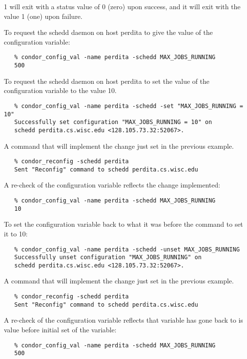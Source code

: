 \begin{ManPage}{\label{man-condor-config-val}}{1}
 will exit with a status value of 0 (zero) upon success,
and it will exit with the value 1 (one) upon failure.

\Examples

To request the schedd daemon on host perdita
to give the value of the
configuration variable:
\begin{verbatim}
   % condor_config_val -name perdita -schedd MAX_JOBS_RUNNING
   500
\end{verbatim}

To request the schedd daemon on host perdita
to set the value of the 
configuration variable
to the value 10.
\begin{verbatim}
   % condor_config_val -name perdita -schedd -set "MAX_JOBS_RUNNING = 10"
   Successfully set configuration "MAX_JOBS_RUNNING = 10" on 
   schedd perdita.cs.wisc.edu <128.105.73.32:52067>.
\end{verbatim}

A command that will implement the change just set in the previous
example.
\begin{verbatim}
   % condor_reconfig -schedd perdita
   Sent "Reconfig" command to schedd perdita.cs.wisc.edu
\end{verbatim}

A re-check of the configuration variable reflects the change implemented:
\begin{verbatim}
   % condor_config_val -name perdita -schedd MAX_JOBS_RUNNING
   10
\end{verbatim}

To set the configuration variable 
back to what it was before the command to set it to 10:
\begin{verbatim}
   % condor_config_val -name perdita -schedd -unset MAX_JOBS_RUNNING
   Successfully unset configuration "MAX_JOBS_RUNNING" on 
   schedd perdita.cs.wisc.edu <128.105.73.32:52067>.
\end{verbatim}

A command that will implement the change just set in the previous
example.
\begin{verbatim}
   % condor_reconfig -schedd perdita
   Sent "Reconfig" command to schedd perdita.cs.wisc.edu
\end{verbatim}

A re-check of the configuration variable reflects that variable
has gone back to is value before initial set of the variable:
\begin{verbatim}
   % condor_config_val -name perdita -schedd MAX_JOBS_RUNNING
   500
\end{verbatim}

\end{ManPage}
